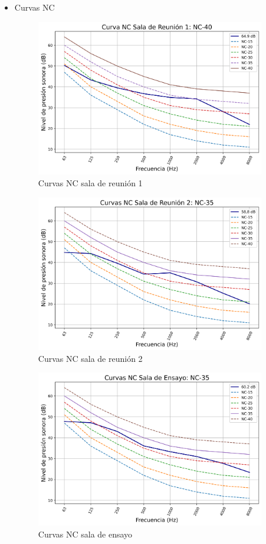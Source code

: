\begin{itemize}
    \item Curvas NC
    \begin{figure}[H]
        \centering
        \includegraphics[width=10cm]{Imagenes/Resultados/Curvas NC-NR/NC reunion 1.png}
        \caption{Curvas NC sala de reunión 1}
        \label{fig: Curvas NC sala 1}
    \end{figure}

    \begin{figure}[H]
        \centering
        \includegraphics[width=10cm]{Imagenes/Resultados/Curvas NC-NR/NC reunion 2.png}
        \caption{Curvas NC sala de reunión 2}
        \label{fig: Curvas NC sala 2}
    \end{figure}

    \begin{figure}[H]
        \centering
        \includegraphics[width=10cm]{Imagenes/Resultados/Curvas NC-NR/NC ensayo.png}
        \caption{Curvas NC sala de ensayo}
        \label{fig: Curvas NC sala de ensayo}
    \end{figure}
    

\end{itemize}
